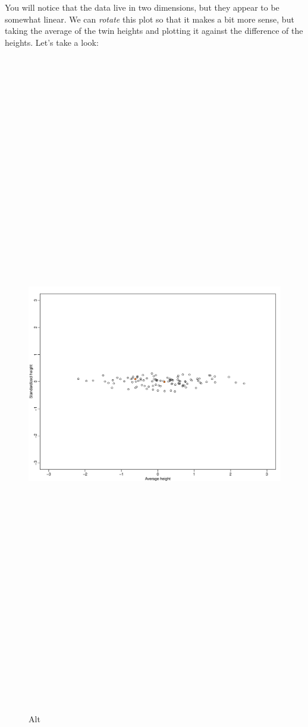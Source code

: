 \documentclass[
]{article}
\begin{document}
You will notice that the data live in two dimensions, but they appear to
be somewhat linear. We can \emph{rotate} this plot so that it makes a
bit more sense, but taking the average of the twin heights and plotting
it against the difference of the heights. Let's take a look:

\begin{figure}
\centering
\includegraphics[width=1\textwidth,height=12.5in]{rotated.pdf}
\caption{Alt}
\end{figure}
\end{document}
